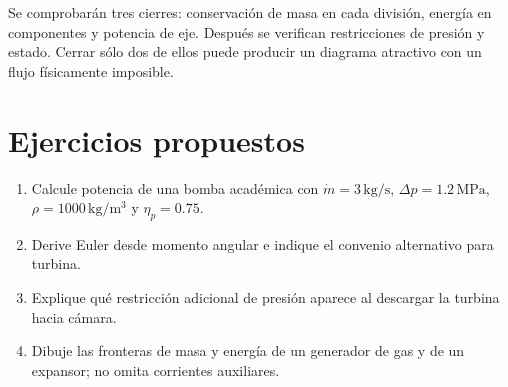 Se comprobarán tres cierres: conservación de masa en cada división, energía en componentes y potencia de eje. Después se verifican restricciones de presión y estado. Cerrar sólo dos de ellos puede producir un diagrama atractivo con un flujo físicamente imposible.
\section{Ejercicios propuestos}
\begin{enumerate}
\item Calcule potencia de una bomba académica con $\dot m=3\,\mathrm{kg/s}$, $\Delta p=1.2\,\mathrm{MPa}$, $\rho=1000\,\mathrm{kg/m^3}$ y $\eta_p=0.75$.
\item Derive Euler desde momento angular e indique el convenio alternativo para turbina.
\item Explique qué restricción adicional de presión aparece al descargar la turbina hacia cámara.
\item Dibuje las fronteras de masa y energía de un generador de gas y de un expansor; no omita corrientes auxiliares.
\end{enumerate}
